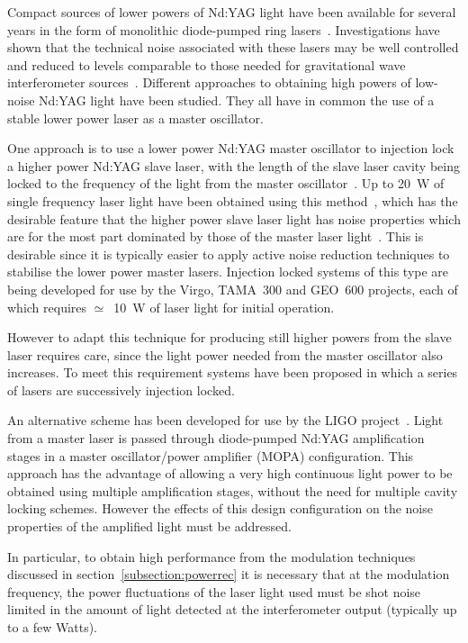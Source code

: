 \documentclass{article}
\begin{document}
Compact sources of lower powers of Nd:YAG light have been available
for several years in the form of monolithic diode-pumped ring
lasers~\cite{Kane1}.  Investigations have shown that the technical
noise associated with these lasers may be well controlled and reduced
to levels comparable to those needed for gravitational wave
interferometer sources~\cite{Kane2, Fritschel, Campbell, Rowan4,
Harb}. Different approaches to obtaining high powers of low-noise
Nd:YAG light have been studied. They all have in common the
use of a stable lower power laser as a master oscillator.
        
One approach is to use a lower power Nd:YAG master oscillator to
injection lock a higher power Nd:YAG slave laser, with the length of
the slave laser cavity being locked to the frequency of the light from
the master oscillator~\cite{Cregut, Nabors, Golla}. Up to 20~W of
single frequency laser light have been obtained using this
method~\cite{Shine}, which has the desirable feature that the higher
power slave laser light has noise properties which are for the most
part dominated by those of the master laser light~\cite{Farinas}. This
is desirable since it is typically easier to apply active noise
reduction techniques to stabilise the lower power master lasers.
Injection locked systems of this type are being developed for use by
the Virgo, TAMA~300 and GEO~600 projects, each of which requires
$\simeq$~10~W of laser light for initial operation.
        
However to adapt this technique for producing still higher powers from
the slave laser requires care, since the light power needed from the
master oscillator also increases. To meet this requirement systems
have been proposed in which a series of lasers are successively
injection locked.
        
An alternative scheme has been developed for use by the LIGO
project~\cite{Weichmann}. Light from a master laser is passed through
diode-pumped Nd:YAG amplification stages in a master oscillator/power
amplifier (MOPA) configuration. This approach has the advantage of
allowing a very high continuous light power to be
obtained using multiple amplification stages, without the need for
multiple cavity locking schemes.  However the
effects of this design configuration on the noise properties of the
amplified light must be addressed.
        
In particular, to obtain high performance from the modulation
techniques discussed in section~\ref{subsection:powerrec} it is
necessary that at the modulation frequency, the power fluctuations of
the laser light used must be shot noise limited in the amount of light
detected at the interferometer output (typically up to a few Watts).
\end{document}
